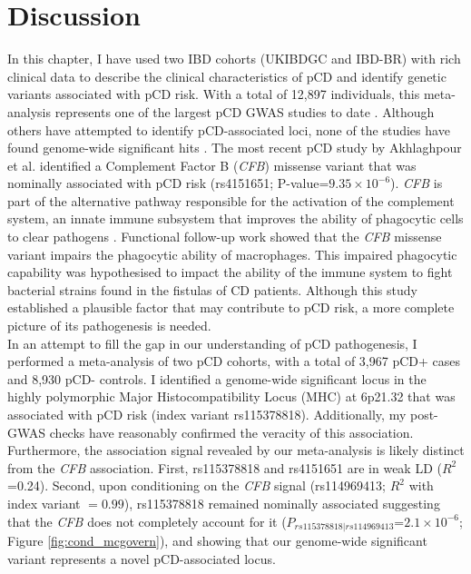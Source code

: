 \section{Discussion}
In this chapter, I have used two IBD cohorts (UKIBDGC and IBD-BR) with rich clinical data to describe the clinical characteristics of pCD and identify genetic variants associated with pCD risk. With a total of 12,897 individuals, this meta-analysis represents one of the largest pCD GWAS studies to date \cite{Akhlaghpour2023-jw}. Although others have attempted to identify pCD-associated loci, none of the studies have found genome-wide significant hits \cite{Akhlaghpour2023-jw,Kaur2016-ut}. The most recent pCD study by Akhlaghpour et al. identified a Complement Factor B (\textit{CFB}) missense variant that was nominally associated with pCD risk (rs4151651; P-value=$9.35\times10^{-6}$). \textit{CFB} is part of the alternative pathway responsible for the activation of the complement system, an innate immune subsystem that improves the ability of phagocytic cells to clear pathogens \cite{Huang2002-of,Goring2009-cs}. Functional follow-up work showed that the \textit{CFB} missense variant impairs the phagocytic ability of macrophages. This impaired phagocytic capability was hypothesised to impact the ability of the immune system to fight bacterial strains found in the fistulas of CD patients. Although this study established a plausible factor that may contribute to pCD risk, a more complete picture of its pathogenesis is needed.\\


In an attempt to fill the gap in our understanding of pCD pathogenesis, I performed a meta-analysis of two pCD cohorts, with a total of 3,967 pCD+ cases and 8,930 pCD- controls. I identified a genome-wide significant locus in the highly polymorphic Major Histocompatibility Locus (MHC) at 6p21.32 that was associated with pCD risk (index variant rs115378818). Additionally, my post-GWAS checks have reasonably confirmed the veracity of this association. Furthermore, the association signal revealed by our meta-analysis is likely distinct from the \textit{CFB} association. First, rs115378818 and rs4151651 are in weak LD ($R^{2}$=0.24). Second, upon conditioning on the \textit{CFB} signal (rs114969413; $R^{2}$ with index variant $=0.99$), rs115378818 remained nominally associated suggesting that the \textit{CFB} does not completely account for it ($P_{rs115378818|rs114969413}$=$2.1\times10^{-6}$; Figure \ref{fig:cond_mcgovern}), and showing that our genome-wide significant variant represents a novel pCD-associated locus. \\

